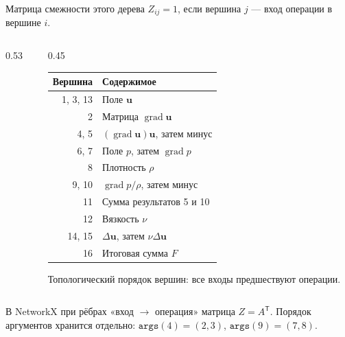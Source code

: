 \documentclass{beamer}
\newcommand{\U}{\mathbf{u}}
\newcommand{\Grad}{\operatorname{grad}}
\newcommand{\TreeEdges}{1/2,2/4,3/4,4/5,6/7,7/9,8/9,9/10,5/11,10/11,13/14,12/15,14/15,11/16,15/16}
\begin{document}
\begin{frame}{Матрица смежности этого дерева}
\small
$Z_{ij}=1$, если вершина $j$ --- вход операции в вершине $i$.
\begin{columns}[c,onlytextwidth]
\begin{column}{0.53\textwidth}
\centering
{}
\end{column}
\begin{column}{0.45\textwidth}
\footnotesize
{\scriptsize
\begin{tabular}{@{}rl@{}}
\toprule
Вершина & Содержимое \\
\midrule
1, 3, 13 & Поле $\U$ \\
2 & Матрица $\Grad\U$ \\
4, 5 & $(\Grad\U)\U$, затем минус \\
6, 7 & Поле $p$, затем $\Grad p$ \\
8 & Плотность $\rho$ \\
9, 10 & $\Grad p/\rho$, затем минус \\
11 & Сумма результатов 5 и 10 \\
12 & Вязкость $\nu$ \\
14, 15 & $\Delta\U$, затем $\nu\Delta\U$ \\
16 & Итоговая сумма $F$ \\
\bottomrule
\end{tabular}
}
\medskip

Топологический порядок вершин:
все входы предшествуют операции.
\end{column}
\end{columns}
\medskip
\footnotesize
В NetworkX при рёбрах «вход $\to$ операция» матрица
$Z=A^{\mathsf T}$. Порядок аргументов хранится отдельно:
$\texttt{args}(4)=(2,3)$, $\texttt{args}(9)=(7,8)$.
\end{frame}
\end{document}
